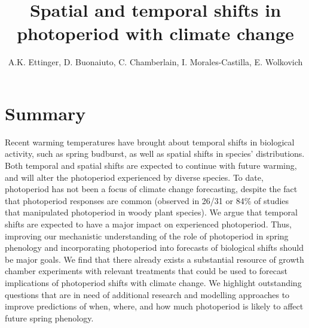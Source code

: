 \documentclass{article}
\begin{document}
 
\title{Spatial and temporal shifts in photoperiod with climate change} %

\author{A.K. Ettinger, D. Buonaiuto, C. Chamberlain, I. Morales-Castilla, E. Wolkovich}
\maketitle  %


\section*{Summary}
Recent warming temperatures have brought about temporal shifts in biological activity, such as spring budburst, as well as spatial shifts in species' distributions. Both temporal and spatial shifts are expected to continue with future warming, and will alter the photoperiod experienced by diverse species. To date, photoperiod has not been a focus of climate change forecasting, despite the fact that photoperiod responses are common (observed in 26/31 or 84\% of studies that manipulated photoperiod in woody plant species). We argue that temporal shifts are expected to have a major impact on experienced photoperiod. Thus, improving our mechanistic understanding of the role of photoperiod in spring phenology and incorporating photoperiod into forecasts of biological shifts should be major goals. %
We find that there already exists a substantial resource of growth chamber experiments with relevant treatments that could be used to forecast implications of photoperiod shifts with climate change. We highlight outstanding questions that are in need of additional research and modelling approaches to improve predictions of when, where, and how much photoperiod is likely to affect future spring phenology.
\end{document}
